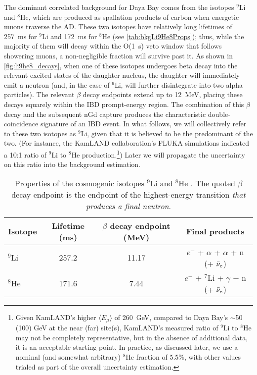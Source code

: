 \documentclass[../thesis.tex]{subfiles}
\begin{document}
The dominant correlated background for Daya Bay comes from the isotopes $^9$Li and $^8$He, which are produced as spallation products of carbon when energetic muons traverse the AD. These two isotopes have relatively long lifetimes of 257~ms for $^9$Li and 172~ms for $^8$He \cite{ENDF} (see \autoref{tab:bkgLi9He8Props}); thus, while the majority of them will decay within the O(1~s) veto window that follows showering muons, a non-negligible fraction will survive past it. As shown in \autoref{fig:li9he8_decays}, when one of these isotopes undergoes beta decay into the relevant excited states of the daughter nucleus, the daughter will immediately emit a neutron (and, in the case of $^9$Li, will further disintegrate into two alpha particles). The relevant $\beta$ decay endpoints extend up to 12~MeV, placing these decays squarely within the IBD prompt-energy region. The combination of this $\beta$ decay and the subsequent nGd capture produces the characteristic double-coincidence signature of an IBD event. In what follows, we will collectively refer to these two isotopes as $^9$Li, given that it is believed to be the predominant of the two. (For instance, the KamLAND collaboration's FLUKA simulations \cite{KamLAND_cosmo} indicated a 10:1 ratio of $^9$Li to $^8$He production.\label{par:kamland_he8}\footnote{Given KamLAND's higher $\langle E_\mu \rangle$ of 260~GeV, compared to Daya Bay's $\sim$50 (100) GeV at the near (far) site(s), KamLAND's measured ratio of $^9$Li to $^8$He may not be completely representative, but in the absence of additional data, it is an acceptable starting point. In practice, as discussed later, we use a nominal (and somewhat arbitrary) $^8$He fraction of 5.5\%, with other values trialed as part of the overall uncertainty estimation.}) Later we will propagate the uncertainty on this ratio into the background estimation. 

\begin{table}[h]
  \begin{tabular}{lccc}
    \toprule
    Isotope & Lifetime (ms) & $\beta$ decay endpoint (MeV) & Final products \\
    \midrule
    $^9$Li & 257.2 & 11.17 & $e^-$ + $\alpha$ + $\alpha$ + n (+ $\bar\nu_e$)\\
    $^8$He & 171.6 & 7.44 & $e^-$ + $^7$Li  + $\gamma$ + n (+ $\bar\nu_e$)\\
    \bottomrule
  \end{tabular}
  \caption{Properties of the cosmogenic isotopes $^9$Li and $^8$He \cite{ENDF}. The quoted $\beta$ decay endpoint is the endpoint of the highest-energy transition \emph{that produces a final neutron}.}
  \label{tab:bkgLi9He8Props}
\end{table}
\end{document}
